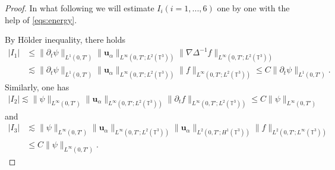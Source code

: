 \documentclass[reqno,a4paper,11pt]{amsart}
\theoremstyle{plain}
\numberwithin{equation}{section}
\begin{document}
\begin{proof}
						
						In what following we will estimate $I_{i}(i=1,...,6)$ one by one with the help of \eqref{eqs:energy}.
						
						By H\"{o}lder inequality, there holds
						\begin{align}
							\label{lem55-5}
							\nonumber |I_{1}|& \leq\|\partial_{t}\psi\|_{L^{1}(0,T')}\|\mathbf{u}_{\alpha}\|_{L^{\infty}(0,T';L^{2}(\mathbb{T}^{3}))}\|\nabla\Delta^{-1}f\|_{L^{\infty}(0,T';L^{2}(\mathbb{T}^{3}))}
							\\& \lesssim  \|\partial_{t}\psi\|_{L^{1}(0,T')}\|\mathbf{u}_{\alpha}\|_{L^{\infty}(0,T';L^{2}(\mathbb{T}^{3}))}\|f\|_{L^{\infty}(0,T';L^{2}(\mathbb{T}^{3}))}
							\leq C\|\partial_{t}\psi\|_{L^{1}(0,T')}.
						\end{align}
						Similarly, one has
						\begin{align}
							\label{lem55-6}
							|I_{2}|\lesssim \|\psi\|_{L^{\infty}(0,T')}\|\mathbf{u}_{\alpha}\|_{L^{\infty}(0,T';L^{2}(\mathbb{T}^{3}))}\|\partial_{t}f\|_{L^{\infty}(0,T';L^{2}(\mathbb{T}^{3}))}
							\leq C\|\psi\|_{L^{\infty}(0,T')}
						\end{align}
						and
						\begin{align}
							\label{lem55-7}
							|I_{3}| &\lesssim \|\psi\|_{L^{\infty}(0,T')}\|\mathbf{u}_{\alpha}\|_{L^{\infty}(0,T';L^{2}(\mathbb{T}^{3}))}\|
							\mathbf{u}_{\alpha}\|_{L^{2}(0,T';H^{1}(\mathbb{T}^{3}))}\|f\|_{L^{2}(0,T';L^{\infty}(\mathbb{T}^{3}))}
							\nonumber\\&\leq C\|\psi\|_{L^{\infty}(0,T')}.
						\end{align}
						

\end{proof}
\end{document}
